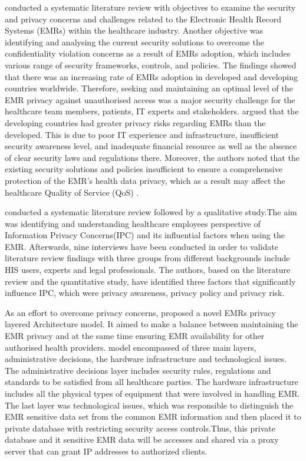 \citet{Mahfuth2016} conducted a systematic literature review with objectives to examine the security and privacy concerns and challenges related to the Electronic Health Record Systems (EMRs) within the healthcare industry. Another objective was identifying and analysing the current security solutions to overcome the confidentiality violation concerns as a result of  EMRs adoption, which includes various range of security frameworks, controls, and policies. The findings showed that there was an increasing rate of EMRs adoption in developed and developing countries worldwide. Therefore, seeking and maintaining an optimal level of the EMR privacy against unauthorised access was a major security challenge for the healthcare team members, patients, IT experts and stakeholders. \citet{Mahfuth2016} argued that the developing countries had greater privacy risks regarding EMRs than the developed. This is due to poor IT experience and  infrastructure, insufficient security awareness level, and inadequate financial resource as well as the absence of clear security laws and regulations there. Moreover, the authors noted that the existing security solutions and policies  insufficient to ensure a comprehensive protection of the EMR's health data privacy, which as a result may affect the healthcare Quality of Service (QoS) \cite{Mahfuth2016}.

\citet{Rahim2016} conducted a systematic literature review followed by a qualitative study.The aim was identifying and understanding healthcare employees perspective of Information Privacy Concerns(IPC) and its influential factors when using the EMR. Afterwards, nine interviews have been conducted in order to validate literature review findings with three groups from different backgrounds include HIS users, experts and legal professionals. The authors, based on the literature review and the quantitative study,  have identified three factors that significantly influence IPC, which were privacy awareness, privacy policy and privacy risk. 

As an effort to overcome privacy concerns, \citet{Bensefia2014} proposed a novel EMRs privacy layered Architecture model. It aimed to make a balance between maintaining the EMR privacy and at the same time ensuring EMR availability for other authorised health providers. \cite{Bensefia2014} model encompassed of three main layers, administrative decisions, the hardware infrastructure and technological issues. The administrative decisions layer includes security rules, regulations and standards to be satisfied from all healthcare parties. The hardware infrastructure includes all the physical types of equipment that were involved in handling EMR. The last layer was technological issues, which was responsible to distinguish the EMR sensitive data set from the common EMR information and then placed it to private database with restricting security access controls.Thus, this private database and it sensitive EMR data will be accesses and shared via a proxy server that can grant IP addresses to authorized clients. 

